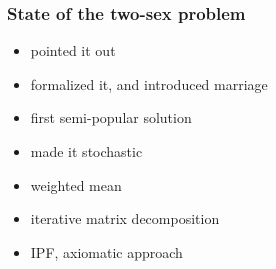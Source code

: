 \documentclass{beamer}
\begin{document}

\begin{frame}
  \frametitle{State of the two-sex problem}
  \begin{itemize}
    \item \cite{kuczynski1932fertility} pointed it out
    \item \cite{karmel1947relations,karmel1948analysis, karmel1948measurement, karmel1948relations} formalized it, and introduced marriage
    \item \cite{pollard1948measurement} first semi-popular solution
    \item \cite{kendall1949stochastic} made it stochastic
    \item \cite{goodman1953population, goodman1967age} weighted mean
    \item \cite{henry1972nuptiality} iterative matrix decomposition
    \item \cite{mcfarland1972comparison, mc1975models} IPF, axiomatic approach
  \end{itemize}
\end{frame}

\end{document}
